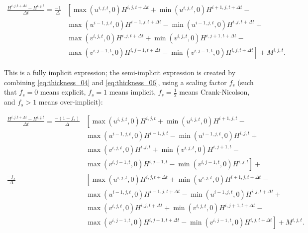 \documentclass{article}
\begin{document}
\begin{equation} \label{eq:thickness_06}
\begin{split}
\frac{H^{i,j,t+\Delta t} - H^{i,j,t}}{\Delta t} = \frac{-1}{\Delta} & \left[ 
\max \left( u^{i,j,t},0 \right) H^{i,j,t+\Delta t} + \min \left( u^{i,j,t},0 \right) H^{i+1,j,t+\Delta t} \right. - \\
& \left. \max \left( u^{i-1,j,t},0 \right) H^{i-1,j,t+\Delta t} - \min \left( u^{i-1,j,t},0 \right) H^{i,j,t+\Delta t} \right. + \\
& \left. \max \left( v^{i,j,t},0 \right) H^{i,j,t+\Delta t} + \min \left( v^{i,j,t},0 \right) H^{i,j+1,t+\Delta t} \right. - \\
& \left. \max \left( v^{i,j-1,t},0 \right) H^{i,j-1,t+\Delta t} - \min \left( v^{i,j-1,t},0 \right) H^{i,j,t+\Delta t} \right]
+ M^{i,j,t}.
\end{split}
\end{equation}

This is a fully implicit expression; the semi-implicit expression is created by combining \eqref{eq:thickness_04} and \eqref{eq:thickness_06}, using a scaling factor $f_s$ (such that $f_s=0$ means explicit, $f_s=1$ means implicit, $f_s=\frac12$ means Crank-Nicolson, and $f_s>1$ means over-implicit):

\begin{equation} \label{eq:thickness_07}
\begin{split}
\frac{H^{i,j,t+\Delta t} - H^{i,j,t}}{\Delta t} = \frac{-\left( 1 - f_s \right)}{\Delta} & \left[ 
\max \left( u^{i,j,t},0 \right) H^{i,j,t} + \min \left( u^{i,j,t},0 \right) H^{i+1,j,t} \right. - \\
& \left. \max \left( u^{i-1,j,t},0 \right) H^{i-1,j,t} - \min \left( u^{i-1,j,t},0 \right) H^{i,j,t} \right. + \\
& \left. \max \left( v^{i,j,t},0 \right) H^{i,j,t} + \min \left( v^{i,j,t},0 \right) H^{i,j+1,t} \right. - \\
& \left. \max \left( v^{i,j-1,t},0 \right) H^{i,j-1,t} - \min \left( v^{i,j-1,t},0 \right) H^{i,j,t} \right] + \\
\frac{-f_s}{\Delta} & \left[
\max \left( u^{i,j,t},0 \right) H^{i,j,t+\Delta t} + \min \left( u^{i,j,t},0 \right) H^{i+1,j,t+\Delta t} \right. - \\
& \left. \max \left( u^{i-1,j,t},0 \right) H^{i-1,j,t+\Delta t} - \min \left( u^{i-1,j,t},0 \right) H^{i,j,t+\Delta t} \right. + \\
& \left. \max \left( v^{i,j,t},0 \right) H^{i,j,t+\Delta t} + \min \left( v^{i,j,t},0 \right) H^{i,j+1,t+\Delta t} \right. - \\
& \left. \max \left( v^{i,j-1,t},0 \right) H^{i,j-1,t+\Delta t} - \min \left( v^{i,j-1,t},0 \right) H^{i,j,t+\Delta t} \right]
+ M^{i,j,t}.
\end{split}
\end{equation}
\end{document}
